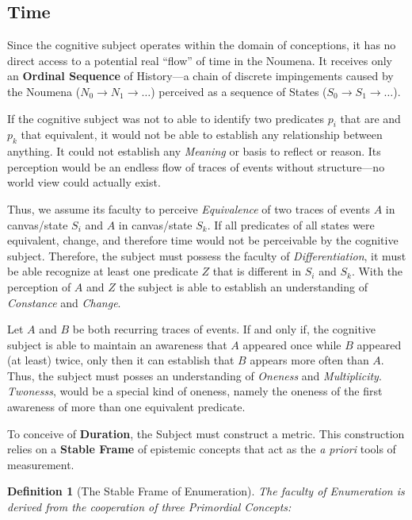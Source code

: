\documentclass[11pt, a4paper]{article}
\theoremstyle{formalism}
\newtheorem{formalism}{Definition}
\begin{document}
{\subsection{Time}

Since the cognitive subject operates within the domain of conceptions, it has
no direct access to a potential real ``flow'' of time in the Noumena. It
receives only an \textbf{Ordinal Sequence} of History---a chain of discrete
impingements caused by the Noumena ($N_0 \to N_1 \to \dots$) perceived as a
sequence of States ($S_0 \to S_1 \to \dots$).

If the cognitive subject was not to able to identify two predicates $p_i$ that are
and $p_k$ that equivalent, it would not be able to establish any relationship
between anything. It could not establish any {\it Meaning\/} or basis to
reflect or reason. Its perception would be an endless flow of traces of 
events without structure---no world view could actually exist.

Thus, we assume its faculty to perceive {\it Equivalence\/} of two traces of
events $A$ in canvas/state $S_i$ and $A$ in canvas/state $S_k$. If all
predicates of all states were equivalent, change, and therefore time would not
be perceivable by the cognitive subject. Therefore, the subject must possess
the faculty of {\it Differentiation}, it must be able recognize at least one
predicate $Z$ that is different in $S_i$ and $S_k$. With the perception of $A$
and $Z$ the subject is able to establish an understanding of {\it Constance\/}
and {\it Change}.

Let $A$ and $B$ be both recurring traces of events. If and only if, the
cognitive subject is able to maintain an awareness that $A$ appeared once while
$B$ appeared (at least) twice, only then it can establish that $B$ appears more
often than $A$. Thus, the subject must posses an understanding of {\it
Oneness\/} and {\it Multiplicity}. {\it Twonesss}, would be a special kind of
oneness, namely the oneness of the first awareness of more than one equivalent
predicate.


To conceive of \textbf{Duration}, the Subject must construct a metric. This
construction relies on a \textbf{Stable Frame} of epistemic concepts that act
as the \textit{a priori} tools of measurement.

\begin{formalism}[The Stable Frame of Enumeration]

    The faculty of Enumeration is derived from the cooperation of three
    Primordial Concepts:


\end{formalism}}
\end{document}
